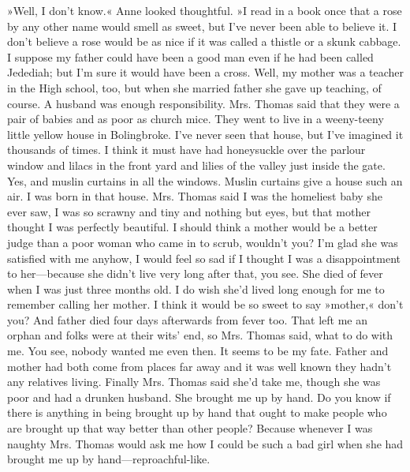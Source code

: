 »Well, I don’t know.« Anne looked thoughtful. »I read in a book once that a rose by any other name would smell as sweet, but I’ve never been able to believe it. I don’t believe a rose would be as nice if it was called a thistle or a skunk cabbage. I suppose my father could have been a good man even if he had been called Jedediah; but I’m sure it would have been a cross. Well, my mother was a teacher in the High school, too, but when she married father she gave up teaching, of course. A husband was enough responsibility. Mrs. Thomas said that they were a pair of babies and as poor as church mice. They went to live in a weeny-teeny little yellow house in Bolingbroke. I’ve never seen that house, but I’ve imagined it thousands of times. I think it must have had honeysuckle over the parlour window and lilacs in the front yard and lilies of the valley just inside the gate. Yes, and muslin curtains in all the windows. Muslin curtains give a house such an air. I was born in that house. Mrs. Thomas said I was the homeliest baby she ever saw, I was so scrawny and tiny and nothing but eyes, but that mother thought I was perfectly beautiful. I should think a mother would be a better judge than a poor woman who came in to scrub, wouldn’t you? I’m glad she was satisfied with me anyhow, I would feel so sad if I thought I was a disappointment to her—because she didn’t live very long after that, you see. She died of fever when I was just three months old. I do wish she’d lived long enough for me to remember calling her mother. I think it would be so sweet to say »mother,« don’t you? And father died four days afterwards from fever too. That left me an orphan and folks were at their wits’ end, so Mrs. Thomas said, what to do with me. You see, nobody wanted me even then. It seems to be my fate. Father and mother had both come from places far away and it was well known they hadn’t any relatives living. Finally Mrs. Thomas said she’d take me, though she was poor and had a drunken husband. She brought me up by hand. Do you know if there is anything in being brought up by hand that ought to make people who are brought up that way better than other people? Because whenever I was naughty Mrs. Thomas would ask me how I could be such a bad girl when she had brought me up by hand—reproachful-like.

